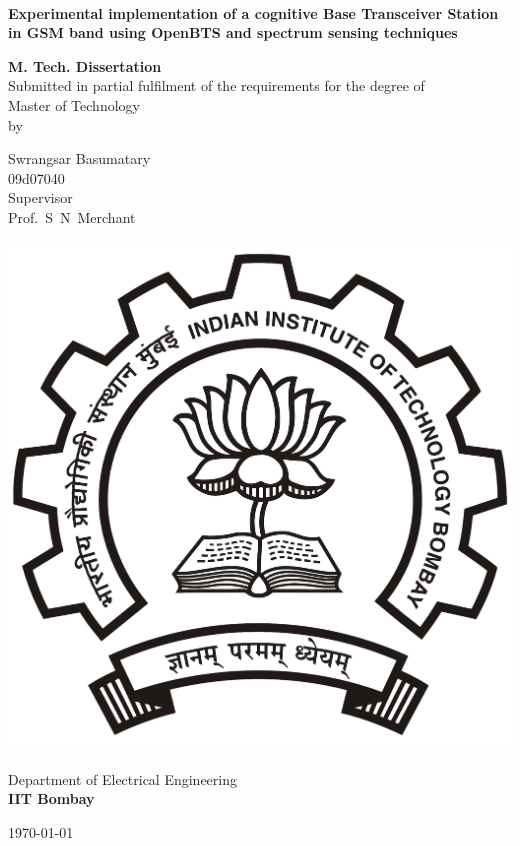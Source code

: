 \begin{titlepage}
\begin{center}
\begin{spacing}{1.0}


~\\[0.3cm]
{ \LARGE \bfseries  Experimental implementation of a cognitive Base 
Transceiver Station in GSM band using OpenBTS and spectrum sensing 
techniques\\[1.2cm] }

\textbf{\large M. Tech. Dissertation}\\[1.2cm]

{Submitted in partial fulfilment of the requirements for the degree 
of\\[0.1cm]
Master of Technology\\[0.3cm]
by\\[0.3cm]}

{\LARGE Swrangsar Basumatary \\[0.1cm]}
{09d07040 \\[1.1cm]}
{Supervisor \\[0.1cm]}
{\LARGE Prof.~S~N~Merchant \\[1.3cm]}

\includegraphics[width=0.21\textheight]{iitbLogo}~\\[0.9cm]
Department of Electrical Engineering\\[0.2cm]
\textbf{\large IIT Bombay}\\[1.3cm]


\vfill

{\large \today}

\end{spacing}
\end{center}
\end{titlepage}
